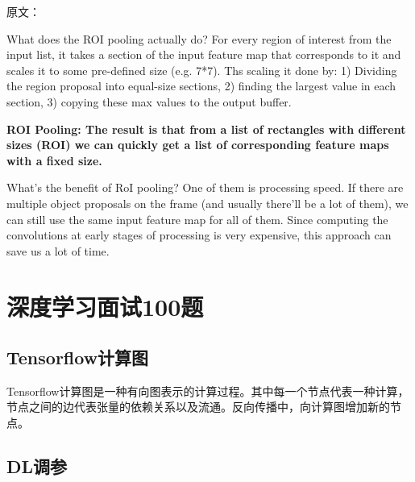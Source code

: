 原文：

What does the ROI pooling actually do? For every region of interest from the input list, it takes a section of the input feature map that corresponds to it and scales it to some pre-defined size (e.g. 7*7). Ths scaling it done by: 1) Dividing the region proposal into equal-size sections, 2) finding the largest value in each section, 3) copying these max values to the output buffer.

\textbf{ROI Pooling: The result is that from a list of rectangles with different sizes (ROI) we can quickly get a list of corresponding feature maps with a fixed size. }


What’s the benefit of RoI pooling? One of them is processing speed. If there are multiple object proposals on the frame (and usually there’ll be a lot of them), we can still use the same input feature map for all of them. Since computing the convolutions at early stages of processing is very expensive, this approach can save us a lot of time.

\section{深度学习面试100题}

\subsection{Tensorflow计算图}

Tensorflow计算图是一种有向图表示的计算过程。其中每一个节点代表一种计算，节点之间的边代表张量的依赖关系以及流通。反向传播中，向计算图增加新的节点。

\subsection{DL调参}


